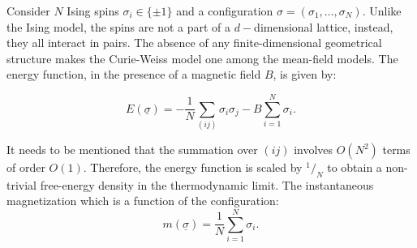 \documentclass[letterpaper,english,12pt]{article}
\begin{document}
Consider $N$ Ising spins $\sigma_{i}\in \{\pm 1\}$ and a configuration $\sigma = (\sigma_{1},\hdots,\sigma_{N})$. Unlike the Ising model, the spins are not a part of a $d-$dimensional lattice, instead, they all interact in pairs. The absence of any finite-dimensional geometrical structure makes the Curie-Weiss model one among the mean-field models. The energy function, in the presence of a magnetic field $B$, is given by:

$$E(\underline{\sigma}) = -\frac{1}{N}\sum_{(ij)}\sigma_{i}\sigma_{j}-B\sum_{i=1}^{N}\sigma_{i}.$$ 

It needs to be mentioned that the summation over $(ij)$ involves $O(N^{2})$ terms of order $O(1)$. Therefore, the energy function is scaled by $^1/_N$ to obtain a non-trivial free-energy density in the thermodynamic limit. The instantaneous magnetization which is a function of the configuration:
$$m(\underline{\sigma}) = \frac{1}{N}\sum_{i=1}^{N}\sigma_{i}.$$
\end{document}
